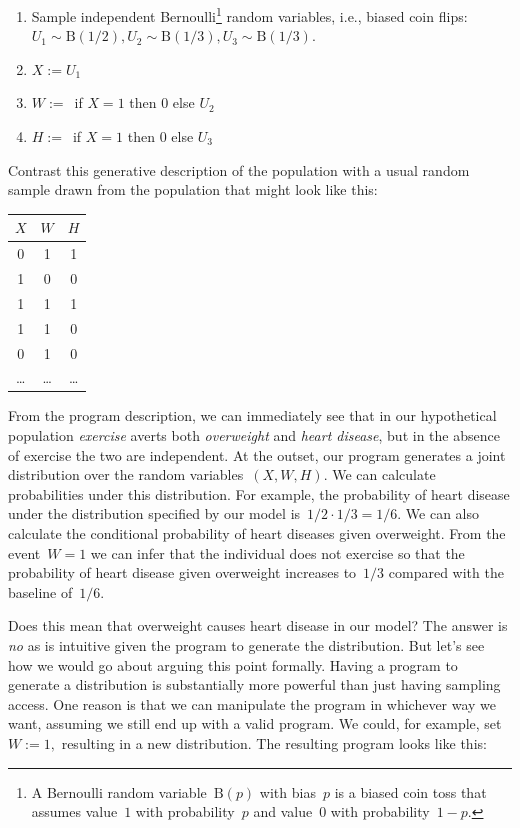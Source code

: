 \documentclass{tufte-book}
\begin{document}
\begin{enumerate}
\def\labelenumi{\arabic{enumi}.}
\tightlist
\item
  Sample independent Bernoulli\footnote{A Bernoulli random
    variable~\(\mathrm{B}(p)\) with bias~\(p\) is a biased coin toss
    that assumes value~\(1\) with probability~\(p\) and value~\(0\) with
    probability~\(1-p.\)} random variables, i.e., biased coin flips:
  \(U_1\sim \mathrm{B}(1/2), U_2\sim \mathrm{B}(1/3), U_3\sim\mathrm{B}(1/3).\)
\item
  \(X := U_1\)
\item
  \(W := \,\) if \(X=1\) then \(0\) else \(U_2\)
\item
  \(H := \,\) if \(X=1\) then \(0\) else \(U_3\)
\end{enumerate}

Contrast this generative description of the population with a usual
random sample drawn from the population that might look like this:

\begin{longtable}[]{@{}ccc@{}}
\toprule
\(X\) & \(W\) & \(H\) \\
\midrule
\endhead
0 & 1 & 1 \\
1 & 0 & 0 \\
1 & 1 & 1 \\
1 & 1 & 0 \\
0 & 1 & 0 \\
\ldots{} & \ldots{} & \ldots{} \\
\bottomrule
\end{longtable}

From the program description, we can immediately see that in our
hypothetical population \emph{exercise} averts both \emph{overweight}
and \emph{heart disease}, but in the absence of exercise the two are
independent. At the outset, our program generates a joint distribution
over the random variables~\((X, W, H).\) We can calculate probabilities
under this distribution. For example, the probability of heart disease
under the distribution specified by our model
is~\(1/2 \cdot 1/3 = 1/6.\) We can also calculate the conditional
probability of heart diseases given overweight. From the event~\(W=1\)
we can infer that the individual does not exercise so that the
probability of heart disease given overweight increases to~\(1/3\)
compared with the baseline of~\(1/6\).

Does this mean that overweight causes heart disease in our model? The
answer is \emph{no} as is intuitive given the program to generate the
distribution. But let's see how we would go about arguing this point
formally. Having a program to generate a distribution is substantially
more powerful than just having sampling access. One reason is that we
can manipulate the program in whichever way we want, assuming we still
end up with a valid program. We could, for example, set~\(W := 1,\)
resulting in a new distribution. The resulting program looks like this:
\end{document}
